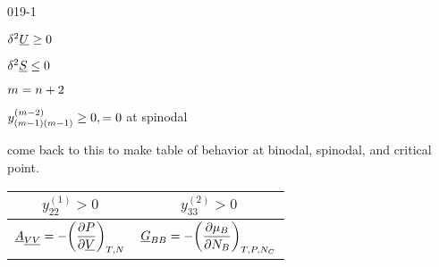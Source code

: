 \begin{mitframe}{019-1} %

  
 	\begin{listone}
        
    \item $\blthick^2 \uline{\intenergy} \geq 0$
    
    \item $\blthick^2 \uline{\entropy} \leq 0$
    
    \item $\mass=n+2$

    \item $y_{(\mass -1)(\mass -1)}^{(\mass -2)} \geq 0 , = 0$ at spinodal
        
    \item come back to this to make table of behavior at binodal, spinodal, and critical point.
    
\end{listone}	
  
\begin{longtable}{ | c | c | } 
 \hline
 	$ y_{22}^{(1)} > 0$ & $ y_{33}^{(2)} > 0$\\ \hline 
    
    $ \uline{\helmholtz}_{\uline{\vol} \uline{\vol}} = -\bigg(\dfrac{\partial\p}{\partial\uline{\vol}}\bigg)_{\Temp,\nummoles}$ & $ \uline{\gibbs}_{\exergy\exergy} = -\bigg(\dfrac{\partial\chempot_{\exergy}}{\partial\nummoles_{\exergy}}\bigg)_{\Temp,\p,\nummoles_{\conc}}$ \\ \hline 
    

\end{longtable}
\end{mitframe}

